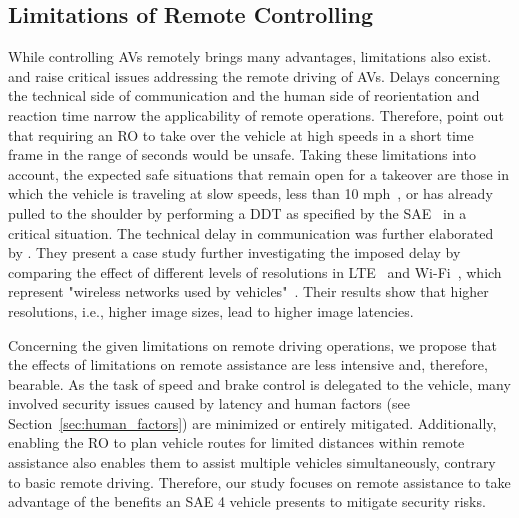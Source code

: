 \subsection{Limitations of Remote Controlling}
\label{sec:limitations}
While controlling AVs remotely brings many advantages, limitations also exist. \citet{cummings_concepts_2020} and \citet{tener_driving_2022} raise critical issues addressing the remote driving of AVs. Delays concerning the technical side of communication and the human side of reorientation and reaction time narrow the applicability of remote operations. Therefore, \citet{cummings_concepts_2020} point out that requiring an RO to take over the vehicle at high speeds in a short time frame in the range of seconds would be unsafe. Taking these limitations into account, the expected safe situations that remain open for a takeover are those in which the vehicle is traveling at slow speeds, less than 10 mph~\cite{cummings_concepts_2020}, or has already pulled to the shoulder by performing a DDT as specified by the SAE~\cite{SAE_J3016} in a critical situation.
The technical delay in communication was further elaborated by \citet{kang_augmenting_2018}. They present a case study further investigating the imposed delay by comparing the effect of different levels of resolutions in LTE~\cite{seo_lte_2016} and Wi-Fi~\cite{song_wi-fi_2017}, which represent "wireless networks used by vehicles"~\cite[p. 22]{kang_augmenting_2018}.
Their results show that higher resolutions, i.e., higher image sizes, lead to higher image latencies. %

Concerning the given limitations on remote driving operations, we propose that the effects of limitations on remote assistance are less intensive and, therefore, bearable. As the task of speed and brake control is delegated to the vehicle, many involved security issues caused by latency and human factors (see  Section~\ref{sec:human_factors}) are minimized or entirely mitigated. Additionally, enabling the RO to plan vehicle routes for limited distances within remote assistance also enables them to assist multiple vehicles simultaneously, contrary to basic remote driving.
Therefore, our study focuses on remote assistance to take advantage of the benefits an SAE 4 vehicle presents to mitigate security risks.

